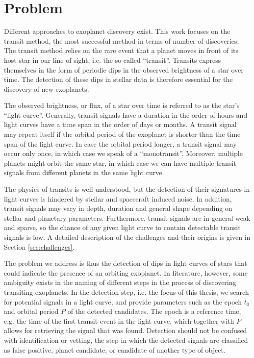 
\section{Problem}

Different approaches to exoplanet discovery exist. This work focuses on the transit method, the most successful method in terms of number of discoveries. The transit method relies on the rare event that a planet moves in front of its host star in our line of sight, i.e. the so-called ``transit''. Transits express themselves in the form of periodic dips in the observed brightness of a star over time. The detection of these dips in stellar data is therefore essential for the discovery of new exoplanets. 

The observed brightness, or flux, of a star over time is referred to as the star's ``light curve''. Generally, transit signals have a duration in the order of hours and light curves have a time span in the order of days or months. A transit signal may repeat itself if the orbital period of the exoplanet is shorter than the time span of the light curve.
In case the orbital period longer, a transit signal may occur only once, in which case we speak of a ``monotransit''. 
Moreover, multiple planets might orbit the same star, in which case we can have multiple transit signals from different planets in the same light curve.

The physics of transits is well-understood, but the detection of their signatures in light curves is hindered by stellar and spacecraft induced noise. 
In addition, transit signals may vary in depth, duration and general shape depending on stellar and planetary parameters.
Furthermore, transit signals are in general weak and sparse, so the chance of any given light curve to contain detectable transit signals is low. A detailed description of the challenges and their origins is given in Section \ref{sec:challenges}.

The problem we address is thus the detection of dips in light curves of stars that could indicate the presence of an orbiting exoplanet. In literature, however, some ambiguity exists in the naming of different steps in the process of discovering transiting exoplanets. In the detection step, i.e. the focus of this thesis, we search for potential signals in a light curve, and provide parameters such as the epoch $t_0$ and orbital period $P$ of the detected candidates. The epoch is a reference time, e.g. the time of the first transit event in the light curve, which together with $P$ allows for retrieving the signal that was found. Detection should not be confused with identification or vetting, the step in which the detected signals are classified as false positive, planet candidate, or candidate of another type of object.

